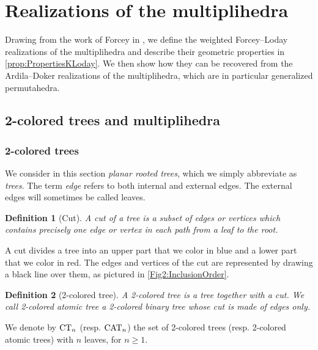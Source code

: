 \documentclass[10pt]{amsart}
\newtheorem{definition}{Definition}[section]
\theoremstyle{remark}
\begin{document}
\section{Realizations of the multiplihedra} 
\label{sec:I}

Drawing from the work of Forcey in \cite{Forcey08}, we define the weighted Forcey--Loday realizations of the multiplihedra and describe their geometric properties in \cref{prop:PropertiesKLoday}.
We then show how they can be recovered from the Ardila--Doker realizations of the multiplihedra, which are in particular generalized permutahedra.


\subsection{2-colored trees and multiplihedra}

\subsubsection{2-colored trees}

We consider in this section \textit{planar rooted trees}, which we simply abbreviate as \textit{trees}. The term \emph{edge} refers to both internal and external edges. The external edges will sometimes be called leaves. 

\begin{definition}[Cut]
A \emph{cut} of a tree is a subset of edges or vertices which contains precisely one edge or vertex in each path from a leaf to the root.
\end{definition}

A cut divides a tree into an upper part that we color in blue and a lower part that we color in red. 
The edges and vertices of the cut are represented by drawing a black line over them, as pictured in \cref{Fig2:InclusionOrder}. 

\begin{definition}[2-colored tree] \label{def:2coloredtree}
A \emph{2-colored tree} is a tree together with a cut. We call \emph{2-colored atomic tree} a 2-colored binary tree whose cut is made of edges only. 
\end{definition}
We denote by $\mathrm{CT}_{n}$ (resp. $\mathrm{CAT}_{n}$) the set of 2-colored trees (resp. 2-colored atomic trees) with $n$ leaves, for $n\geq 1$. 
\end{document}
